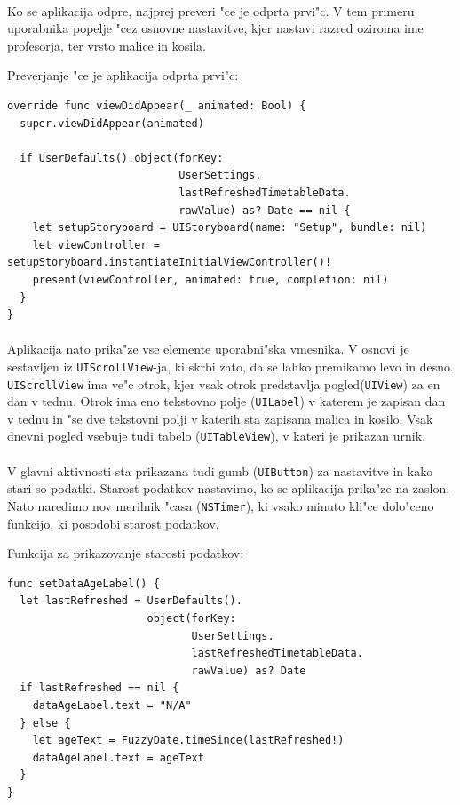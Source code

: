 \paragraph{}Ko se aplikacija odpre, najprej preveri "ce je odprta prvi"c. V tem primeru uporabnika popelje "cez osnovne nastavitve, kjer nastavi razred oziroma ime profesorja, ter vrsto malice in kosila. 

\begin{center}
	Preverjanje "ce je aplikacija odprta prvi"c:
\end{center}
\begin{verbatim}
override func viewDidAppear(_ animated: Bool) {
  super.viewDidAppear(animated)

  if UserDefaults().object(forKey:
                           UserSettings.
                           lastRefreshedTimetableData.
                           rawValue) as? Date == nil {
    let setupStoryboard = UIStoryboard(name: "Setup", bundle: nil)
    let viewController = setupStoryboard.instantiateInitialViewController()!
    present(viewController, animated: true, completion: nil)
  }
}
\end{verbatim}

\paragraph{}
Aplikacija nato prika"ze vse elemente uporabni"ska vmesnika. V osnovi je sestavljen iz \texttt{UIScrollView}-ja, ki skrbi zato, da se lahko premikamo levo in desno. \texttt{UIScrollView} ima ve"c otrok, kjer vsak otrok predstavlja pogled(\texttt{UIView}) za en dan v tednu. Otrok ima eno tekstovno polje (\texttt{UILabel}) v katerem je zapisan dan v tednu in "se dve tekstovni polji v katerih sta zapisana malica in kosilo. Vsak dnevni pogled vsebuje tudi tabelo (\texttt{UITableView}), v kateri je prikazan urnik.

\paragraph{}
V glavni aktivnosti sta prikazana tudi gumb (\texttt{UIButton}) za nastavitve in kako stari so podatki. Starost podatkov nastavimo, ko se aplikacija prika"ze na zaslon. Nato naredimo nov merilnik "casa (\texttt{NSTimer}), ki vsako minuto kli"ce dolo"ceno funkcijo, ki posodobi starost podatkov.

\begin{center}
	Funkcija za prikazovanje starosti podatkov:
\end{center}
\begin{verbatim}
func setDataAgeLabel() {
  let lastRefreshed = UserDefaults().
                      object(forKey:
                             UserSettings.
                             lastRefreshedTimetableData.
                             rawValue) as? Date
  if lastRefreshed == nil {
    dataAgeLabel.text = "N/A"
  } else {
    let ageText = FuzzyDate.timeSince(lastRefreshed!)
    dataAgeLabel.text = ageText
  }
}
\end{verbatim}

